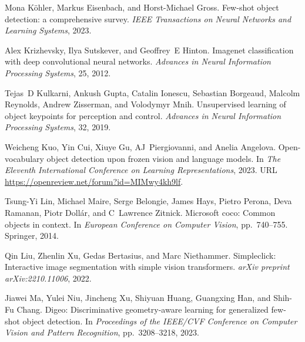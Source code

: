 \begin{thebibliography}{52}
Mona K{\"o}hler, Markus Eisenbach, and Horst-Michael Gross.
\newblock Few-shot object detection: a comprehensive survey.
\newblock \emph{IEEE Transactions on Neural Networks and Learning Systems},
  2023.

Alex Krizhevsky, Ilya Sutskever, and Geoffrey~E Hinton.
\newblock Imagenet classification with deep convolutional neural networks.
\newblock \emph{Advances in Neural Information Processing Systems}, 25, 2012.

Tejas~D Kulkarni, Ankush Gupta, Catalin Ionescu, Sebastian Borgeaud, Malcolm
  Reynolds, Andrew Zisserman, and Volodymyr Mnih.
\newblock Unsupervised learning of object keypoints for perception and control.
\newblock \emph{Advances in Neural Information Processing Systems}, 32, 2019.

Weicheng Kuo, Yin Cui, Xiuye Gu, AJ~Piergiovanni, and Anelia Angelova.
\newblock Open-vocabulary object detection upon frozen vision and language
  models.
\newblock In \emph{The Eleventh International Conference on Learning
  Representations}, 2023.
\newblock URL \url{https://openreview.net/forum?id=MIMwy4kh9lf}.

Tsung-Yi Lin, Michael Maire, Serge Belongie, James Hays, Pietro Perona, Deva
  Ramanan, Piotr Doll{\'a}r, and C~Lawrence Zitnick.
\newblock Microsoft coco: Common objects in context.
\newblock In \emph{European Conference on Computer Vision}, pp.\  740--755.
  Springer, 2014.

Qin Liu, Zhenlin Xu, Gedas Bertasius, and Marc Niethammer.
\newblock Simpleclick: Interactive image segmentation with simple vision
  transformers.
\newblock \emph{arXiv preprint arXiv:2210.11006}, 2022.

Jiawei Ma, Yulei Niu, Jincheng Xu, Shiyuan Huang, Guangxing Han, and Shih-Fu
  Chang.
\newblock Digeo: Discriminative geometry-aware learning for generalized
  few-shot object detection.
\newblock In \emph{Proceedings of the IEEE/CVF Conference on Computer Vision
  and Pattern Recognition}, pp.\  3208--3218, 2023.


\end{thebibliography}
